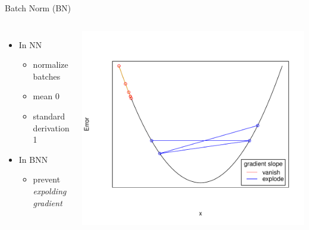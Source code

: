 \documentclass[aspectratio=1610, 12pt]{beamer}
\begin{document}
\begin{frame}{Batch Norm (BN)}
\begin{columns}

\begin{itemize}
	\item In NN
	\begin{itemize}
		\item normalize batches
		\item mean 0
		\item standard derivation 1
	\end{itemize}
	\item In BNN
	\begin{itemize}
		\item prevent \textit{expolding gradient}
	\end{itemize}
\end{itemize}
\centering
\vspace*{-1cm}\includegraphics[scale=0.5]{images/gradient_graph.pdf}
\end{columns}
\end{frame}
\end{document}
